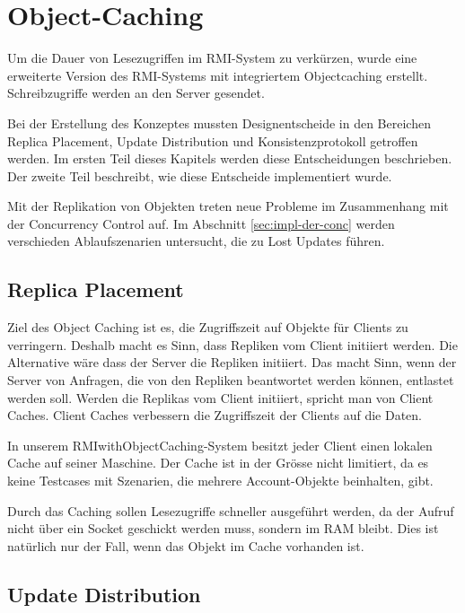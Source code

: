\chapter{Object-Caching}
\label{sec:object-caching}

Um die Dauer von Lesezugriffen im RMI-System zu verkürzen, wurde eine erweiterte Version des RMI-Systems mit integriertem Objectcaching erstellt. Schreibzugriffe werden an den Server gesendet. 

Bei der Erstellung des Konzeptes mussten Designentscheide in den Bereichen Replica Placement, Update Distribution und Konsistenzprotokoll getroffen werden. Im ersten Teil dieses Kapitels werden diese Entscheidungen beschrieben. Der zweite Teil beschreibt, wie diese Entscheide implementiert wurde.

Mit der Replikation von Objekten treten neue Probleme im Zusammenhang mit der Concurrency Control auf. Im Abschnitt \ref{sec:impl-der-conc} werden verschieden Ablaufszenarien untersucht, die zu Lost Updates führen.

\section{Replica Placement}
\label{sec:replica-management}

Ziel des Object Caching ist es, die Zugriffszeit auf Objekte für Clients zu verringern. Deshalb macht es Sinn, dass Repliken vom Client initiiert werden. Die Alternative wäre dass der Server die Repliken initiiert. Das macht Sinn, wenn der Server von Anfragen, die von den Repliken beantwortet werden können, entlastet werden soll. Werden die Replikas vom Client initiiert, spricht man von Client Caches. Client Caches verbessern die Zugriffszeit der Clients auf die Daten.

In unserem RMIwithObjectCaching-System besitzt jeder Client einen lokalen Cache auf seiner Maschine. Der Cache ist in der Grösse nicht limitiert, da es keine Testcases mit Szenarien, die mehrere Account-Objekte beinhalten, gibt. 

Durch das Caching sollen Lesezugriffe schneller ausgeführt werden, da der Aufruf nicht über ein Socket geschickt werden muss, sondern im RAM bleibt. Dies ist natürlich nur der Fall, wenn das Objekt im Cache vorhanden ist.

\section{Update Distribution}
\label{sec:update-distribution}

